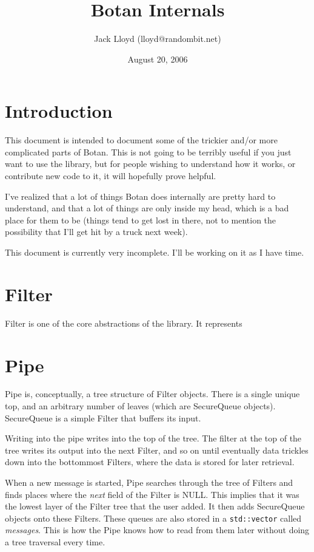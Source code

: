 \documentclass{article}
\title{Botan Internals}
\author{Jack Lloyd (lloyd@randombit.net)}
\date{August 20, 2006}
\newcommand{\type}[1]{\texttt{#1}}
\renewcommand{\arg}[1]{\textsl{#1}}
\begin{document}
\maketitle

\tableofcontents

\parskip=5pt

\section{Introduction}

This document is intended to document some of the trickier and/or more
complicated parts of Botan. This is not going to be terribly useful if
you just want to use the library, but for people wishing to understand
how it works, or contribute new code to it, it will hopefully prove
helpful.

I've realized that a lot of things Botan does internally are pretty
hard to understand, and that a lot of things are only inside my head,
which is a bad place for them to be (things tend to get lost in there,
not to mention the possibility that I'll get hit by a truck next
week).

This document is currently very incomplete. I'll be working on it as I
have time.

\pagebreak

\section{Filter}

Filter is one of the core abstractions of the library. It represents

\section{Pipe}

Pipe is, conceptually, a tree structure of Filter objects. There is a
single unique top, and an arbitrary number of leaves (which are
SecureQueue objects).  SecureQueue is a simple Filter that buffers its
input.

Writing into the pipe writes into the top of the tree. The filter at
the top of the tree writes its output into the next Filter, and so on
until eventually data trickles down into the bottommost Filters, where
the data is stored for later retrieval.

When a new message is started, Pipe searches through the tree of
Filters and finds places where the \arg{next} field of the Filter is
NULL. This implies that it was the lowest layer of the Filter tree
that the user added. It then adds SecureQueue objects onto these
Filters. These queues are also stored in a \type{std::vector} called
\arg{messages}. This is how the Pipe knows how to read from them later
without doing a tree traversal every time.
\end{document}
